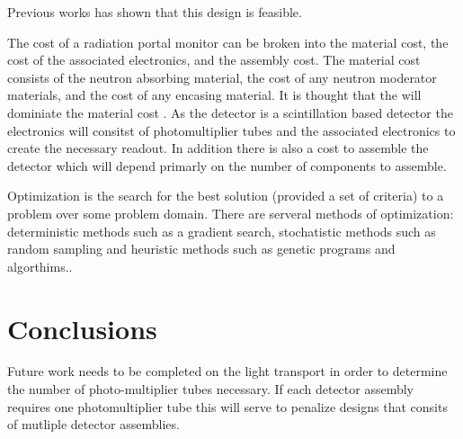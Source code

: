 \documentclass[draftcls,onecolumn]{IEEEtran}
\begin{document}
Previous works has shown that this design is feasible.
 
The cost of a radiation portal monitor can be broken into the material cost, the cost of the associated electronics, and the assembly cost.
The material cost consists of the neutron absorbing material, the cost of any neutron moderator materials, and the cost of any encasing material. 
It is thought that the  will dominiate the material cost .
As the detector is a scintillation based detector the electronics will consitst of photomultiplier tubes and the associated electronics to create the necessary readout.
In addition there is also a cost to assemble the detector which will depend primarly on the number of components to assemble.

Optimization is the search for the best solution (provided a set of criteria) to a problem over some problem domain.
There are serveral methods of optimization: deterministic methods such as a gradient search, stochatistic methods such as random sampling and heuristic methods such as genetic programs and algorthims..





\section{Conclusions}

Future work needs to be completed on the light transport in order to determine the number of photo-multiplier tubes necessary. 
If each detector assembly requires one photomultiplier tube this will serve to penalize designs that consits of mutliple detector assemblies.


\pagebreak
\appendix

\end{document}
